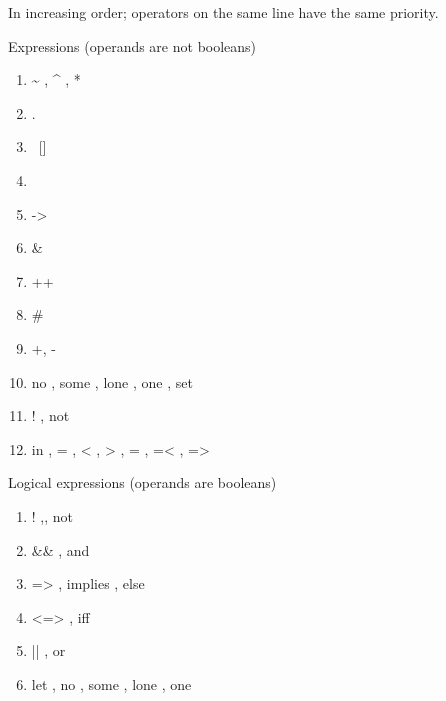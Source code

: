 \documentclass{article}
\newlength\tw
\begin{document}
In increasing order; operators on the same line have the same priority.

\begin{minipage}{\tw}
Expressions (operands are not booleans)
\begin{enumerate}
\itemsep=0em
\item \~{} , \^{}  , *
\item .
\item ~[]
\item <: , :>
\item ->
\item &
\item ++
\item #
\item +, -
\item no , some , lone , one , set
\item ! , not
\item in , = , < , > , = , =< , =>
\end{enumerate}
\end{minipage}
\begin{minipage}{\tw}
Logical expressions (operands are booleans) 
\begin{enumerate}
\itemsep=0em
\item ! ,, not
\item \&\& , and
\item => , implies , else
\item <=> , iff
\item || , or
\item let , no , some , lone , one 
\end{enumerate}
\\~
\\~
\\~
\\~
\\~
\\~
\\~
\end{minipage}
\end{document}
